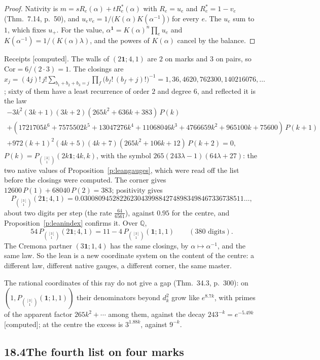 \documentclass[11pt]{article}
\newcommand{\one}{\mathbf 1}
\newcommand{\Pth}{P_{\binom{[3]}1}(\one;1,1)}
\theoremstyle{plain}
\theoremstyle{definition}
\theoremstyle{remark}
\newcommand{\computed}{\textup{[computed]}}
\begin{document}
\begin{proof}
Nativity is $m=sR_e(\alpha)+tR^\ast_e(\alpha)$ with $R_e=u_e$ and $R^\ast_e=1-v_e$ (Thm.~7.14, p.~50), and $u_ev_e=1/\big(K(\alpha)K(\alpha^{-1})\big)$ for every $e$. The $u_e$ sum to $1$, which fixes $u_+$. For the value, $\alpha^{\one}=K(\alpha)^n\prod_eu_e$ and $K(\alpha^{-1})=1/(K(\alpha)\lambda)$, and the powers of $K(\alpha)$ cancel by the balance.
\end{proof}

\noindent Receipts \computed. The walls of $(2\one;4,1)$ are $2$ on marks and $3$ on pairs, so $\mathrm{Cor}=6/(2\cdot3)=1$. The closings are $x_j=(4j)!\,j!\sum_{b_1+b_2+b_3=j}\prod_f\big(b_f!\,(b_f+j)!\big)^{-1}=1,36,4620,762300,140216076,\dots$; sixty of them have a least recurrence of order $2$ and degree $6$, and reflected it is the law
\begin{gather*}
-3k^2(3k+1)(3k+2)(265k^2+636k+383)\,P(k)\\
+(1721705k^6+7575502k^5+13047276k^4+11068046k^3+4766659k^2+965100k+75600)\,P(k+1)\\
+972(k+1)^2(4k+5)(4k+7)(265k^2+106k+12)\,P(k+2)=0,
\end{gather*}
$P(k)=P_{\binom{[3]}1}(2k\one;4k,k)$, with the symbol $265(243\lambda-1)(64\lambda+27)$: the two native values of Proposition~\ref{p:leangauges}, which were read off the list before the closings were computed. The corner gives $12600\,P(1)+68040\,P(2)=383$; positivity gives
\[
P_{\binom{[3]}1}(2\one;4,1)=0.0300809452822623043998842748983498467336738511\ldots,
\]
about two digits per step (the rate $\frac{64}{6561}$), against $0.95$ for the centre, and Proposition~\ref{p:leanindex} confirms it. Over $\mathbb Q$,
\[
54\,P_{\binom{[3]}1}(2\one;4,1)=11-4\,\Pth\qquad(380\text{ digits}).
\]
The Cremona partner $(3\one;1,4)$ has the same closings, by $\alpha\mapsto\alpha^{-1}$, and the same law. So the lean is a new coordinate system on the content of the centre: a different law, different native gauges, a different corner, the same master.

The rational coordinates of this ray do not give a gap (Thm.~34.3, p.~300): on $(1,\Pth)$ their denominators beyond $d_k^2$ grow like $e^{8.7k}$, with primes of the apparent factor $265k^2+\cdots$ among them, against the decay $243^{-k}=e^{-5.49k}$ \computed; at the centre the excess is $3^{1.88k}$, against $9^{-k}$.

\subsection*{18.4\quad The fourth list on four marks}
\end{document}
